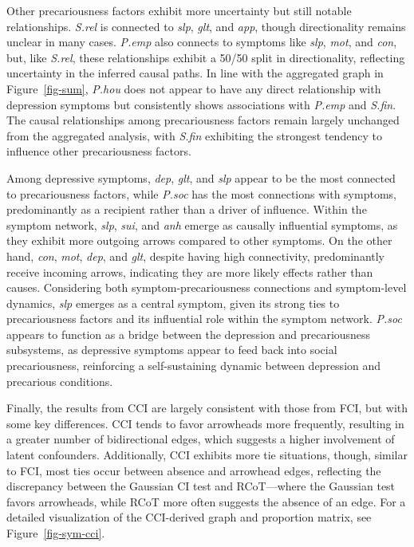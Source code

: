 \documentclass[
]{article}
\begin{document}
Other precariousness factors exhibit more uncertainty but still notable
relationships. \emph{S.rel} is connected to \emph{slp}, \emph{glt}, and
\emph{app}, though directionality remains unclear in many cases.
\emph{P.emp} also connects to symptoms like \emph{slp}, \emph{mot}, and
\emph{con}, but, like \emph{S.rel}, these relationships exhibit a 50/50
split in directionality, reflecting uncertainty in the inferred causal
paths. In line with the aggregated graph in Figure~\ref{fig-sum},
\emph{P.hou} does not appear to have any direct relationship with
depression symptoms but consistently shows associations with
\emph{P.emp} and \emph{S.fin}. The causal relationships among
precariousness factors remain largely unchanged from the aggregated
analysis, with \emph{S.fin} exhibiting the strongest tendency to
influence other precariousness factors.

Among depressive symptoms, \emph{dep}, \emph{glt}, and \emph{slp} appear
to be the most connected to precariousness factors, while \emph{P.soc}
has the most connections with symptoms, predominantly as a recipient
rather than a driver of influence. Within the symptom network,
\emph{slp}, \emph{sui}, and \emph{anh} emerge as causally influential
symptoms, as they exhibit more outgoing arrows compared to other
symptoms. On the other hand, \emph{con}, \emph{mot}, \emph{dep}, and
\emph{glt}, despite having high connectivity, predominantly receive
incoming arrows, indicating they are more likely effects rather than
causes. Considering both symptom-precariousness connections and
symptom-level dynamics, \emph{slp} emerges as a central symptom, given
its strong ties to precariousness factors and its influential role
within the symptom network. \emph{P.soc} appears to function as a bridge
between the depression and precariousness subsystems, as depressive
symptoms appear to feed back into social precariousness, reinforcing a
self-sustaining dynamic between depression and precarious conditions.

Finally, the results from CCI are largely consistent with those from
FCI, but with some key differences. CCI tends to favor arrowheads more
frequently, resulting in a greater number of bidirectional edges, which
suggests a higher involvement of latent confounders. Additionally, CCI
exhibits more tie situations, though, similar to FCI, most ties occur
between absence and arrowhead edges, reflecting the discrepancy between
the Gaussian CI test and RCoT---where the Gaussian test favors
arrowheads, while RCoT more often suggests the absence of an edge. For a
detailed visualization of the CCI-derived graph and proportion matrix,
see Figure~\ref{fig-sym-cci}.
\end{document}
